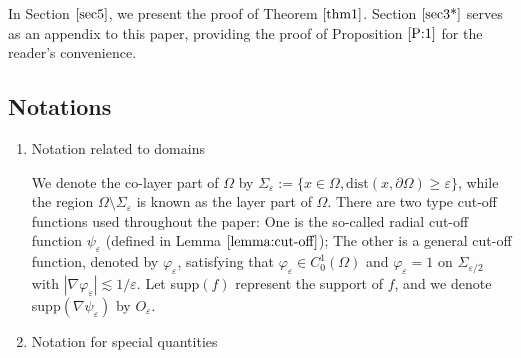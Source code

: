 \documentclass[13pt,CJK]{article}
\theoremstyle{plain}                       %
\theoremstyle{remark}
\numberwithin{equation}{section}
\begin{document}
In Section $\ref{sec5}$, we present the proof of Theorem $\ref{thm1}$. Section $\ref{sec3*}$ serves as an appendix to this paper, providing the proof of Proposition $\ref{P:1}$ for the reader's convenience.

\subsection{\centering Notations}\label{notation}

\begin{enumerate}
\item Notation related to domains

We denote the co-layer part of $\Omega$ by $\Sigma_{\varepsilon}:=\{x\in\Omega,\text{dist}
(x,\partial\Omega)\geq \varepsilon\}$, while the region
$\Omega\setminus\Sigma_\varepsilon$ is known as
the layer part of $\Omega$.
There are two type cut-off functions used throughout the paper: One is
the so-called radial cut-off function $\psi_\varepsilon$
(defined in Lemma $\ref{lemma:cut-off}$); The other
is a general cut-off function, denoted by $\varphi_{\varepsilon}$, satisfying that
$\varphi_{\varepsilon}\in C^{1}_{0}(\Omega)$ and $\varphi_\varepsilon = 1$ on
$\Sigma_{\varepsilon/2}$ with
$|\nabla \varphi_{\varepsilon}|\lesssim 1/\varepsilon$.
Let supp$(f)$ represent the support of $f$, and we
denote supp$(\nabla\psi_\varepsilon)$ by $O_\varepsilon$.

\item Notation for special quantities


\end{enumerate}
\end{document}
